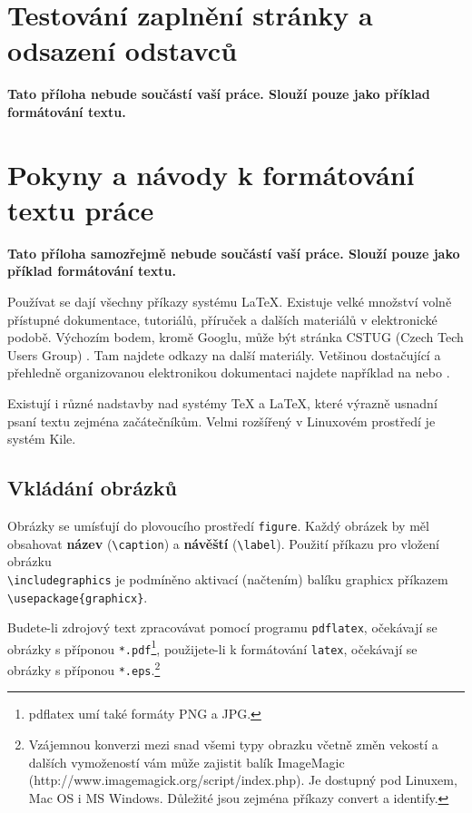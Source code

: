 	\appendix
	
	\chapter{Testování zaplnění stránky a odsazení odstavců}
	\textbf{\large Tato příloha nebude součástí vaší práce. 
		Slouží pouze jako příklad formátování textu.}
	
	\section*{}
	
	
	\chapter{Pokyny a návody k formátování textu práce}
	\textbf{\large Tato příloha samozřejmě nebude součástí vaší práce. Slouží pouze jako příklad formátování textu.}
	
	Používat se dají všechny příkazy systému \LaTeX. Existuje velké množství volně přístupné dokumentace, tutoriálů, příruček a dalších materiálů v elektronické podobě. Výchozím bodem, kromě Googlu, může být stránka CSTUG (Czech Tech Users Group) \cite{CSTUG}. Tam najdete odkazy na další materiály.  Vetšinou dostačující a přehledně organizovanou elektronikou dokumentaci najdete například na \cite{latexdocweb} nebo \cite{latexwiki}.
	
	Existují i různé nadstavby nad systémy \TeX{} a \LaTeX, které výrazně usnadní psaní textu zejména začátečníkům. Velmi rozšířený v Linuxovém prostředí je systém Kile.
	
	
	\section{Vkládání obrázků}
	Obrázky se umísťují do plovoucího prostředí \verb|figure|. Každý obrázek by měl obsahovat \textbf{název} (\verb|\caption|) a \textbf{návěští} (\verb|\label|). Použití příkazu pro vložení obrázku \\\verb|\includegraphics| je podmíněno aktivací (načtením) balíku graphicx příkazem\\ \verb|\usepackage{graphicx}|.
	
	Budete-li zdrojový text zpracovávat pomocí programu \verb|pdflatex|, očekávají se obrázky s příponou \verb|*.pdf|\footnote{pdflatex umí také formáty PNG a JPG.}, použijete-li k formátování \verb|latex|, očekávají se obrázky s příponou \verb|*.eps|.\footnote{Vzájemnou konverzi mezi snad všemi typy obrazku včetně změn vekostí a dalších vymožeností vám může zajistit balík ImageMagic  (http://www.imagemagick.org/script/index.php). Je dostupný pod Linuxem, Mac OS i MS Windows. Důležité jsou zejména příkazy convert a identify.}
	
